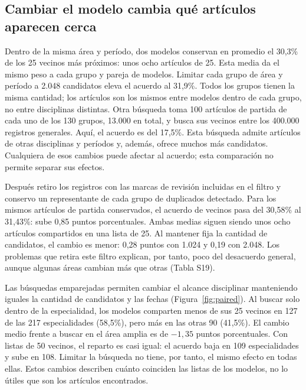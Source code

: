 \documentclass[12pt]{article}
\begin{document}
\FloatBarrier
\subsection{Cambiar el modelo cambia qué artículos aparecen cerca}
Dentro de la misma área y período, dos modelos conservan en promedio el 30,3\% de los 25 vecinos más próximos: unos ocho artículos de 25. Esta media da el mismo peso a cada grupo y pareja de modelos. Limitar cada grupo de área y período a 2.048 candidatos eleva el acuerdo al 31,9\%. Todos los grupos tienen la misma cantidad; los artículos son los mismos entre modelos dentro de cada grupo, no entre disciplinas distintas. Otra búsqueda toma 100 artículos de partida de cada uno de los 130 grupos, 13.000 en total, y busca sus vecinos entre los 400.000 registros generales. Aquí, el acuerdo es del 17,5\%. Esta búsqueda admite artículos de otras disciplinas y períodos y, además, ofrece muchos más candidatos. Cualquiera de esos cambios puede afectar al acuerdo; esta comparación no permite separar sus efectos.

Después retiro los registros con las marcas de revisión incluidas en el filtro y conservo un representante de cada grupo de duplicados detectado. Para los mismos artículos de partida conservados, el acuerdo de vecinos pasa del 30,58\% al 31,43\%: sube 0,85 puntos porcentuales. Ambas medias siguen siendo unos ocho artículos compartidos en una lista de 25. Al mantener fija la cantidad de candidatos, el cambio es menor: 0,28 puntos con 1.024 y 0,19 con 2.048. Los problemas que retira este filtro explican, por tanto, poco del desacuerdo general, aunque algunas áreas cambian más que otras (Tabla S19).

Las búsquedas emparejadas permiten cambiar el alcance disciplinar manteniendo iguales la cantidad de candidatos y las fechas (Figura~\ref{fig:paired}). Al buscar solo dentro de la especialidad, los modelos comparten menos de sus 25 vecinos en 127 de las 217 especialidades (58,5\%), pero más en las otras 90 (41,5\%). El cambio medio frente a buscar en el área amplia es de $-1,35$ puntos porcentuales. Con listas de 50 vecinos, el reparto es casi igual: el acuerdo baja en 109 especialidades y sube en 108. Limitar la búsqueda no tiene, por tanto, el mismo efecto en todas ellas. Estos cambios describen cuánto coinciden las listas de los modelos, no lo útiles que son los artículos encontrados.
\end{document}
